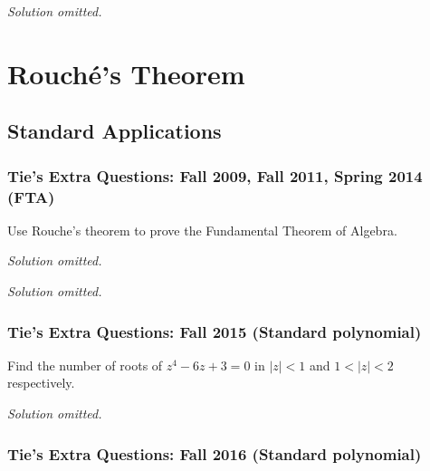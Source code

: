\emph{Solution omitted.}

\hypertarget{rouchuxe9s-theorem}{%
\section{Rouché's Theorem}\label{rouchuxe9s-theorem}}

\hypertarget{standard-applications}{%
\subsection{Standard Applications}\label{standard-applications}}

\hypertarget{ties-extra-questions-fall-2009-fall-2011-spring-2014-fta}{%
\subsubsection{Tie's Extra Questions: Fall 2009, Fall 2011, Spring 2014
(FTA)}\label{ties-extra-questions-fall-2009-fall-2011-spring-2014-fta}}

\begin{problem}[?]

Use Rouche's theorem to prove the Fundamental Theorem of Algebra.

\end{problem}

\emph{Solution omitted.}

\emph{Solution omitted.}

\hypertarget{ties-extra-questions-fall-2015-standard-polynomial}{%
\subsubsection{Tie's Extra Questions: Fall 2015 (Standard
polynomial)}\label{ties-extra-questions-fall-2015-standard-polynomial}}

\begin{problem}[?]

Find the number of roots of \(z^4 - 6z + 3 =0\) in \(|z|<1\) and
\(1 < |z| < 2\) respectively.

\end{problem}

\emph{Solution omitted.}

\hypertarget{ties-extra-questions-fall-2016-standard-polynomial}{%
\subsubsection{Tie's Extra Questions: Fall 2016 (Standard
polynomial)}\label{ties-extra-questions-fall-2016-standard-polynomial}}

